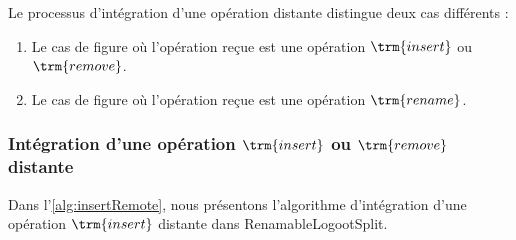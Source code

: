 Le processus d'intégration d'une opération distante distingue deux cas différents :
\begin{enumerate}
  \item Le cas de figure où l'opération reçue est une opération $\trm{insert}$ ou $\trm{remove}$.
  \item Le cas de figure où l'opération reçue est une opération $\trm{rename}$.
\end{enumerate}

\subsubsection{Intégration d'une opération $\trm{insert}$ ou $\trm{remove}$ distante}

\label{sec:integration-process-insert-remove-op}

Dans l'\autoref{alg:insertRemote}, nous présentons l'algorithme d'intégration d'une opération $\trm{insert}$ distante dans RenamableLogootSplit.

